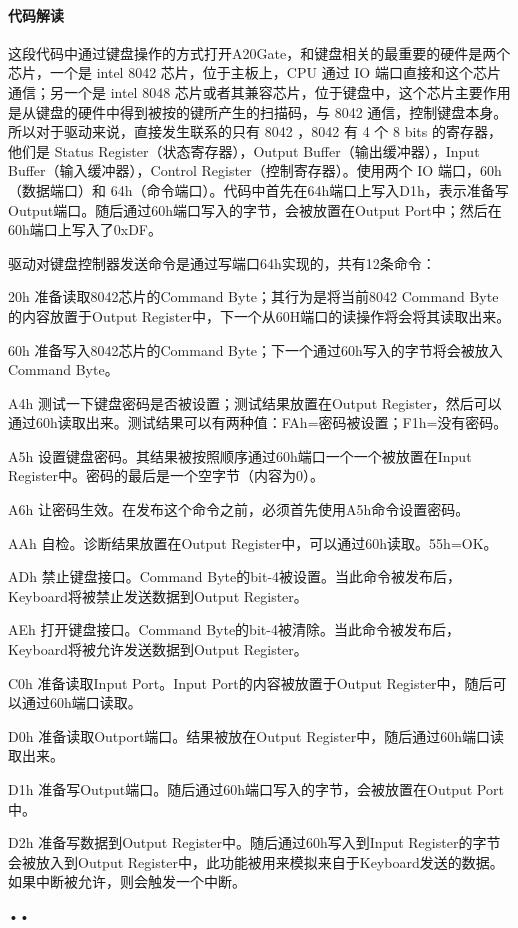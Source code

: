 \documentclass[12pt]{article}
\begin{document}
\paragraph{代码解读}
这段代码中通过键盘操作的方式打开A20Gate，和键盘相关的最重要的硬件是两个芯片，一个是 intel 8042 芯片，位于主板上，CPU 通过 IO 端口直接和这个芯片通信；另一个是 intel 8048 芯片或者其兼容芯片，位于键盘中，这个芯片主要作用是从键盘的硬件中得到被按的键所产生的扫描码，与 8042 通信，控制键盘本身。所以对于驱动来说，直接发生联系的只有 8042 ，8042 有 4 个 8 bits 的寄存器，他们是 Status Register（状态寄存器），Output Buffer（输出缓冲器），Input Buffer（输入缓冲器），Control Register（控制寄存器）。使用两个 IO 端口，60h （数据端口）和 64h（命令端口）。代码中首先在64h端口上写入D1h，表示准备写Output端口。随后通过60h端口写入的字节，会被放置在Output Port中；然后在60h端口上写入了0xDF。

驱动对键盘控制器发送命令是通过写端口64h实现的，共有12条命令：
\begin{list}{•}{•}
\item 20h 准备读取8042芯片的Command Byte；其行为是将当前8042 Command Byte的内容放置于Output Register中，下一个从60H端口的读操作将会将其读取出来。
\item 60h 准备写入8042芯片的Command Byte；下一个通过60h写入的字节将会被放入Command Byte。
\item A4h 测试一下键盘密码是否被设置；测试结果放置在Output Register，然后可以通过60h读取出来。测试结果可以有两种值：FAh=密码被设置；F1h=没有密码。
\item A5h 设置键盘密码。其结果被按照顺序通过60h端口一个一个被放置在Input Register中。密码的最后是一个空字节（内容为0）。
\item A6h 让密码生效。在发布这个命令之前，必须首先使用A5h命令设置密码。
\item AAh 自检。诊断结果放置在Output Register中，可以通过60h读取。55h=OK。
\item ADh 禁止键盘接口。Command Byte的bit-4被设置。当此命令被发布后，Keyboard将被禁止发送数据到Output Register。
\item AEh 打开键盘接口。Command Byte的bit-4被清除。当此命令被发布后，Keyboard将被允许发送数据到Output Register。
\item C0h 准备读取Input Port。Input Port的内容被放置于Output Register中，随后可以通过60h端口读取。
\item D0h 准备读取Outport端口。结果被放在Output Register中，随后通过60h端口读取出来。
\item D1h 准备写Output端口。随后通过60h端口写入的字节，会被放置在Output Port中。
\item D2h 准备写数据到Output Register中。随后通过60h写入到Input Register的字节会被放入到Output Register中，此功能被用来模拟来自于Keyboard发送的数据。如果中断被允许，则会触发一个中断。
\end{list}{•}{•}
\end{document}
